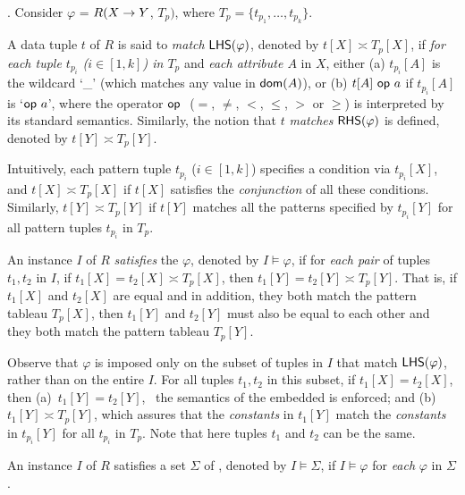 . Consider \pCFD $\varphi$ =
$R(X\rightarrow Y$, $T_p)$, where $T_p = \{t_{p_1}, \ldots, t_{p_k}\}$.

A data tuple $t$ of $R$ is said to {\em match} ${\mathsf{LHS}}(\varphi)$,
denoted by $t[X] \asymp T_p[X]$, if {\em for each tuple
$t_{p_i}$ ($i\in[1, k]$) in $T_p$} and {\em each attribute $A$} in $X$, either
(a)  $t_{p_i}[A]$ is the wildcard `\_' (which matches any value
in $\protect\mathsf{dom}(A)$),  or
(b) $t[A]\ \op a$ if $t_{p_i}[A]$ is `$\op a$', where
the operator $\op$ ($=$, $\ne$,
$<$, $\le$, $>$ or $\ge$) is interpreted by its standard
semantics. Similarly, the notion that $t$ {\em matches} ${\mathsf{RHS}}(\varphi)$
is defined, denoted by $t[Y] \asymp T_p[Y]$.


Intuitively, each pattern tuple $t_{p_i}$ ($i\in[1, k]$) specifies a condition via
$t_{p_i}[X]$, and $t[X] \asymp T_p[X]$ if
 $t[X]$ satisfies the {\em conjunction} of all these conditions.
Similarly, $t[Y] \asymp T_p[Y]$ if $t[Y]$ matches all the patterns
specified by $t_{p_i}[Y]$ for all pattern tuples $t_{p_i}$ in $T_p$.

An instance $I$ of $R$ {\em satisfies} the \pCFD $\varphi$, denoted
by $I \models \varphi$, if  for {\em each pair} of tuples $t_1, t_2$
in $I$, if $t_1[X] = t_2[X] \asymp T_p[X]$, then
$t_1[Y] = t_2[Y] \asymp T_p[Y]$.  That is, if $t_1[X]$ and $t_2[X]$
are equal and in addition, they both match the pattern tableau
$T_p[X]$, then $t_1[Y]$ and $t_2[Y]$ must also be equal to each
other and they both match the pattern tableau $T_p[Y]$.

Observe that $\varphi$ is imposed only on the subset of tuples in
$I$ that match ${\mathsf{LHS}}(\varphi)$, rather than on the entire $I$. For
all tuples $t_1, t_2$ in this subset, if $t_1[X] = t_2[X]$, then
(a)~$t_1[Y] = t_2[Y]$, \ie~the semantics of the embedded \FDs is
enforced; and (b)~$t_1[Y] \asymp T_p[Y]$, which assures that the
{\em constants} in $t_1[Y]$ match the {\em constants} in $t_{p_i}[Y]$
for all $t_{p_i}$ in $T_p$. Note that here tuples $t_1$ and $t_2$ can
be the same.



An instance $I$ of $R$ satisfies a set $\Sigma$ of \pCFDs,
denoted by $I\models\Sigma$, if $I\models\varphi$ for {\em each}
\pCFD $\varphi$ in $\Sigma$.


